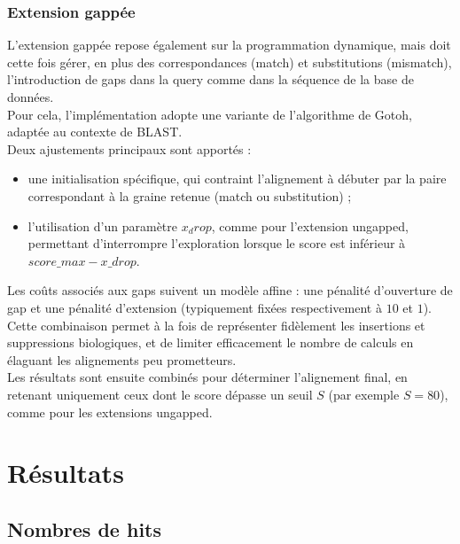 \documentclass[conference]{IEEEtran}
\begin{document}
\subsubsection{Extension gappée}
L’extension gappée repose également sur la programmation dynamique, mais doit cette fois gérer, en plus des correspondances (match) et substitutions (mismatch), l’introduction de gaps dans la query comme dans la séquence de la base de données.\\
Pour cela, l’implémentation adopte une variante de l’algorithme de Gotoh, adaptée au contexte de BLAST.\\
Deux ajustements principaux sont apportés :
\begin{itemize}
\item une initialisation spécifique, qui contraint l’alignement à débuter par la paire correspondant à la graine retenue (match ou substitution) ;
\item l’utilisation d’un paramètre $x_drop$, comme pour l’extension ungapped, permettant d’interrompre l’exploration lorsque le score est inférieur à $score\_max - x\_drop$.
\end{itemize}
Les coûts associés aux gaps suivent un modèle affine : une pénalité d’ouverture de gap et une pénalité d’extension (typiquement fixées respectivement à $10$ et $1$).\\
Cette combinaison permet à la fois de représenter fidèlement les insertions et suppressions biologiques, et de limiter efficacement le nombre de calculs en élaguant les alignements peu prometteurs.\\
Les résultats sont ensuite combinés pour déterminer l’alignement final, en retenant uniquement ceux dont le score dépasse un seuil $S$ (par exemple $S = 80$), comme pour les extensions ungapped.

\section{Résultats}
\subsection{Nombres de hits}
\end{document}

